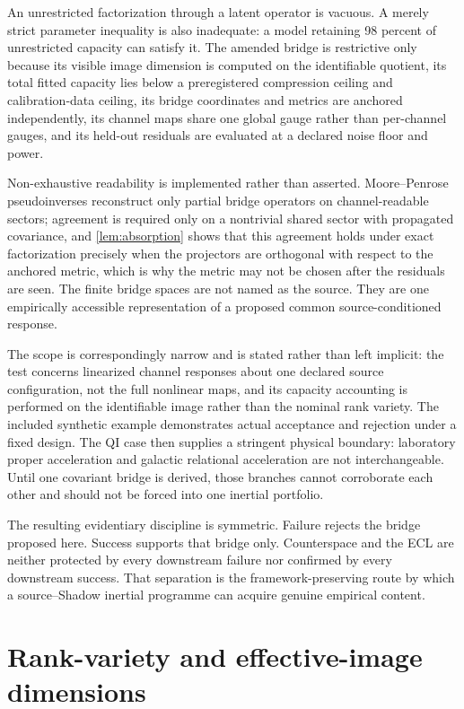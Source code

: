 \documentclass[11pt]{article}
\begin{document}
An unrestricted factorization through a latent operator is vacuous. A merely strict parameter inequality is also inadequate: a model retaining 98 percent of unrestricted capacity can satisfy it. The amended bridge is restrictive only because its visible image dimension is computed on the identifiable quotient, its total fitted capacity lies below a preregistered compression ceiling and calibration-data ceiling, its bridge coordinates and metrics are anchored independently, its channel maps share one global gauge rather than per-channel gauges, and its held-out residuals are evaluated at a declared noise floor and power.

Non-exhaustive readability is implemented rather than asserted. Moore--Penrose pseudoinverses reconstruct only partial bridge operators on channel-readable sectors; agreement is required only on a nontrivial shared sector with propagated covariance, and \cref{lem:absorption} shows that this agreement holds under exact factorization precisely when the projectors are orthogonal with respect to the anchored metric, which is why the metric may not be chosen after the residuals are seen. The finite bridge spaces are not named as the source. They are one empirically accessible representation of a proposed common source-conditioned response.

The scope is correspondingly narrow and is stated rather than left implicit: the test concerns linearized channel responses about one declared source configuration, not the full nonlinear maps, and its capacity accounting is performed on the identifiable image rather than the nominal rank variety. The included synthetic example demonstrates actual acceptance and rejection under a fixed design. The QI case then supplies a stringent physical boundary: laboratory proper acceleration and galactic relational acceleration are not interchangeable. Until one covariant bridge is derived, those branches cannot corroborate each other and should not be forced into one inertial portfolio.

The resulting evidentiary discipline is symmetric. Failure rejects the bridge proposed here. Success supports that bridge only. Counterspace and the ECL are neither protected by every downstream failure nor confirmed by every downstream success. That separation is the framework-preserving route by which a source--Shadow inertial programme can acquire genuine empirical content.

\appendix

\section{Rank-variety and effective-image dimensions}
\end{document}
